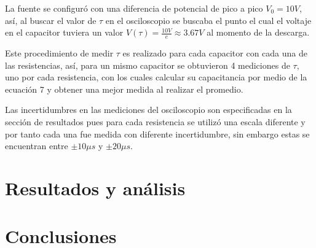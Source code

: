 \documentclass[10pt,letter]{article}
\begin{document}
\begin{multicols}{2}
La fuente se configuró con una diferencia de potencial de pico a pico $V_0=10V$, así, al buscar el valor de $\tau$ en el osciloscopio se buscaba el punto el cual el voltaje en el capacitor tuviera un valor $V(\tau)=\frac{10V}{e}\approx3.67V$ al momento de la descarga.

\vspace{0.2cm}

Este procedimiento de medir $\tau$ es realizado para cada capacitor con cada una de las resistencias, así, para un mismo capacitor se obtuvieron 4 mediciones de $\tau$, uno por cada resistencia, con los cuales calcular su capacitancia por medio de la ecuación 7 y obtener una mejor medida al realizar el promedio. 

\vspace{0.2cm}

Las incertidumbres en las mediciones del osciloscopio son especificadas en la sección de resultados pues para cada resistencia se utilizó una escala diferente y por tanto cada una fue medida con diferente incertidumbre, sin embargo estas se encuentran entre $\pm 10\mu s$ y $\pm 20 \mu s$.







\section{Resultados y análisis}


\section{Conclusiones}


\end{multicols}
\end{document}
